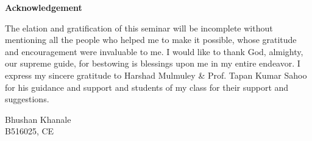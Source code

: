 \vspace{1in}
\centerline{\Large{\bf Acknowledgement}}
\vspace{.75cm}
\noindent The elation and gratification of this seminar will be incomplete
without mentioning all the people who helped me to make it possible, whose
gratitude and encouragement were invaluable to me. I would like to thank God,
almighty, our supreme guide, for bestowing is blessings upon me in my entire
endeavor. I express my sincere gratitude to  Harshad Mulmuley \& Prof. Tapan
Kumar Sahoo for his guidance and support and students of my class for their
support and suggestions.

\vspace*{0.5in}
\begin{flushright}
Bhushan Khanale\\
B516025, CE\\
\end{flushright}
